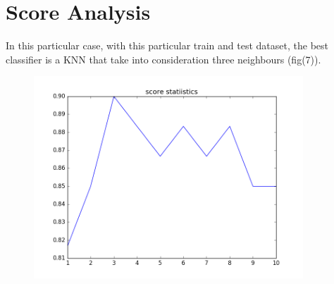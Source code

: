 \documentclass{article}
\begin{document}
				


				\section{Score Analysis}
				
				In this particular case, with this particular train and test dataset, the best classifier is a KNN that take into consideration three neighbours (fig(7)).
								\begin{center}

\begin{figure}
\centering
\includegraphics[width=0.9\textwidth]{figure_12}
\caption{}
\label{fig:7}
\end{figure}
\end{center}
\end{document}
